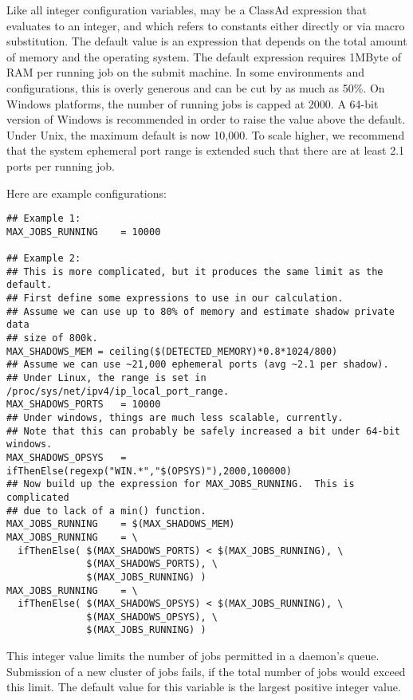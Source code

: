 \begin{description}
  Like all integer configuration variables, 
  may be a ClassAd expression that evaluates to an integer, and which
  refers to constants either directly or via macro substitution.
  The default value is an expression that depends on the total amount
  of memory and the operating system.  The default
  expression requires 1MByte of RAM per running job on the submit machine.
  In some environments and configurations, this is overly
  generous and can be cut by as much as 50\%.
  On Windows platforms, the number of running jobs is capped at 2000.
  A 64-bit version of Windows  is recommended in order to raise the value
  above the default.
  Under Unix, the maximum default is now 10,000.  To scale higher, we
  recommend that the system ephemeral port range is extended
  such that there are at least 2.1 ports per running job.

  Here are example configurations:

\footnotesize
\begin{verbatim}
## Example 1:
MAX_JOBS_RUNNING	= 10000

## Example 2:
## This is more complicated, but it produces the same limit as the default.
## First define some expressions to use in our calculation.
## Assume we can use up to 80% of memory and estimate shadow private data
## size of 800k.
MAX_SHADOWS_MEM	= ceiling($(DETECTED_MEMORY)*0.8*1024/800)
## Assume we can use ~21,000 ephemeral ports (avg ~2.1 per shadow).
## Under Linux, the range is set in /proc/sys/net/ipv4/ip_local_port_range.
MAX_SHADOWS_PORTS	= 10000
## Under windows, things are much less scalable, currently.
## Note that this can probably be safely increased a bit under 64-bit windows.
MAX_SHADOWS_OPSYS	= ifThenElse(regexp("WIN.*","$(OPSYS)"),2000,100000)
## Now build up the expression for MAX_JOBS_RUNNING.  This is complicated
## due to lack of a min() function.
MAX_JOBS_RUNNING	= $(MAX_SHADOWS_MEM)
MAX_JOBS_RUNNING	= \
  ifThenElse( $(MAX_SHADOWS_PORTS) < $(MAX_JOBS_RUNNING), \
              $(MAX_SHADOWS_PORTS), \
              $(MAX_JOBS_RUNNING) )
MAX_JOBS_RUNNING	= \
  ifThenElse( $(MAX_SHADOWS_OPSYS) < $(MAX_JOBS_RUNNING), \
              $(MAX_SHADOWS_OPSYS), \
              $(MAX_JOBS_RUNNING) )
\end{verbatim}
\normalsize

\label{param:MaxJobsSubmitted}
\item[\Macro{MAX\_JOBS\_SUBMITTED}]
  This integer value limits the number of jobs permitted in 
  a  daemon's queue. Submission of a new cluster
  of jobs fails, if the total number of jobs would exceed this limit. 
  The default value for this variable is the largest positive
  integer value.


\end{description}
